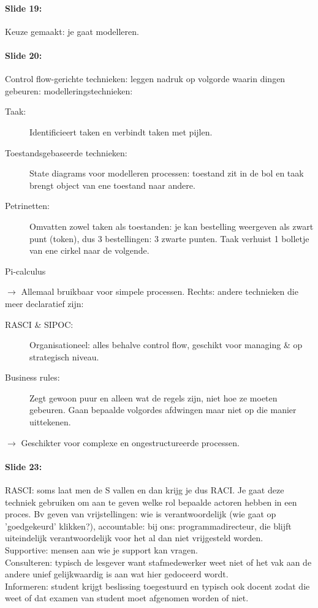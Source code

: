 \documentclass[10pt,a4paper]{report}
\begin{document}
\paragraph{Slide 19:}Keuze gemaakt: je gaat modelleren.

\paragraph{Slide 20:}Control flow-gerichte technieken: leggen nadruk op volgorde waarin dingen gebeuren: modelleringstechnieken:
\begin{description}
\item[Taak:]Identificieert taken en verbindt taken met pijlen.
\item[Toestandsgebaseerde technieken:]State diagrams voor modelleren processen: toestand zit in de bol en taak brengt object van ene toestand naar andere.
\item[Petrinetten:]Omvatten zowel taken als toestanden: je kan bestelling weergeven als zwart punt (token), dus 3 bestellingen: 3 zwarte punten. Taak verhuist 1 bolletje van ene cirkel naar de volgende.
\item[Pi-calculus]
\end{description}
$\rightarrow$ Allemaal bruikbaar voor simpele processen.
Rechts: andere technieken die meer declaratief zijn:
\begin{description}
\item[RASCI \& SIPOC:]Organisationeel: alles behalve control flow, geschikt voor managing \& op strategisch niveau.
\item[Business rules:]Zegt gewoon puur en alleen wat de regels zijn, niet hoe ze moeten gebeuren. Gaan bepaalde volgordes afdwingen maar niet op die manier uittekenen.
\end{description}
$\rightarrow$ Geschikter voor complexe en ongestructureerde processen.

\paragraph{Slide 23:}RASCI: soms laat men de S vallen en dan krijg je dus RACI. Je gaat deze techniek gebruiken om aan te geven welke rol bepaalde actoren hebben in een proces. Bv geven van vrijstellingen: wie is verantwoordelijk (wie gaat op 'goedgekeurd' klikken?), accountable: bij ons: programmadirecteur, die blijft uiteindelijk verantwoordelijk voor het al dan niet vrijgesteld worden.\\
Supportive: mensen aan wie je support kan vragen.\\
Consulteren: typisch de lesgever want stafmedewerker weet niet of het vak aan de andere unief gelijkwaardig is aan wat hier gedoceerd wordt.\\
Informeren: student krijgt beslissing toegestuurd en typisch ook docent zodat die weet of dat examen van student moet afgenomen worden of niet.
\end{document}
